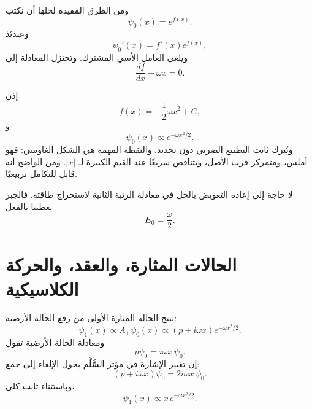 \begin{classroomqa}
\end{classroomqa}

ومن الطرق المفيدة لحلها أن نكتب
\begin{equation}
\psi_{0}(x)=e^{f(x)}.
\end{equation}
وعندئذ
\[
\psi_{0}'(x)=f'(x)e^{f(x)},
\]
ويلغى العامل الأسي المشترك. وتختزل المعادلة إلى
\begin{equation}
\frac{df}{dx}+\omega x=0.
\end{equation}

\begin{classroomqa}
\end{classroomqa}

إذن
\begin{equation}
f(x)=-\frac12\omega x^{2}+C,
\end{equation}
و
\begin{equation}
\psi_{0}(x)\propto e^{-\omega x^{2}/2}.
\end{equation}
ويُترك ثابت التطبيع الضربي دون تحديد. والنقطة المهمة هي الشكل الغاوسي: فهو أملس، ومتمركز قرب الأصل، ويتناقص سريعًا عند القيم الكبيرة لـ \(\lvert x\rvert\). ومن الواضح أنه قابل للتكامل تربيعيًا.

لا حاجة إلى إعادة التعويض بالحل في معادلة الرتبة الثانية لاستخراج طاقته. فالجبر يعطينا بالفعل
\begin{equation}
E_{0}=\frac{\omega}{2}.
\end{equation}

\section{الحالات المثارة، والعقد، والحركة الكلاسيكية}

تنتج الحالة المثارة الأولى من رفع الحالة الأرضية:
\begin{equation}
\psi_{1}(x)\propto A_{+}\psi_{0}(x)
\propto(p+i\omega x)e^{-\omega x^{2}/2}.
\end{equation}
ومعادلة الحالة الأرضية تقول
\[
p\psi_{0}=i\omega x\,\psi_{0}.
\]
إن تغيير الإشارة في مؤثر السُّلَّم يحول الإلغاء إلى جمع:
\begin{equation}
(p+i\omega x)\psi_{0}
=2i\omega x\,\psi_{0}.
\end{equation}
وباستثناء ثابت كلي،
\begin{equation}
\psi_{1}(x)\propto x\,e^{-\omega x^{2}/2}.
\end{equation}

